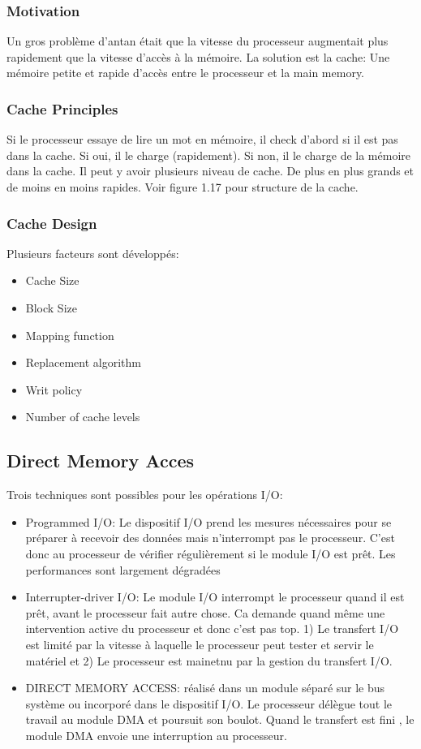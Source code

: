 \subsubsection{Motivation}
Un gros problème d’antan était que la vitesse du processeur augmentait plus rapidement que la vitesse d’accès à la mémoire. La solution est la cache: Une mémoire petite et rapide d’accès entre le processeur et la main memory.

\subsubsection{Cache Principles}
Si le processeur essaye de lire un mot en mémoire, il check d’abord si il est pas dans la cache. Si oui, il le charge (rapidement). Si non, il le charge de la mémoire dans la cache. Il peut y avoir plusieurs niveau de cache. De plus en plus grands et de moins en moins rapides. Voir figure 1.17 pour structure de la cache.

\subsubsection{Cache Design}
Plusieurs facteurs sont développés:
\begin{itemize}
	\item Cache Size
	\item Block Size
	\item Mapping function
	\item Replacement algorithm
	\item Writ policy
	\item Number of cache levels
\end{itemize}

\subsection{Direct Memory Acces}
Trois techniques sont possibles pour les opérations I/O:
\begin{itemize}
	\item Programmed I/O: Le dispositif I/O prend les mesures nécessaires pour se préparer à recevoir des données mais n’interrompt pas le processeur. C’est donc au processeur de vérifier régulièrement si le module I/O est prêt. Les performances sont largement dégradées
	\item Interrupter-driver I/O: Le module I/O interrompt le processeur quand il est prêt, avant le processeur fait autre chose. Ca demande quand même une intervention active du processeur et donc c’est pas top. 1) Le transfert I/O est limité par la vitesse à laquelle le processeur peut tester et servir le matériel et 2) Le processeur est mainetnu par la gestion du transfert I/O.
	\item DIRECT MEMORY ACCESS: réalisé dans un module séparé sur le bus système ou incorporé dans le dispositif I/O. Le processeur délègue tout le travail au module DMA et poursuit son boulot. Quand le transfert est fini , le module DMA envoie une interruption au processeur.
\end{itemize}

